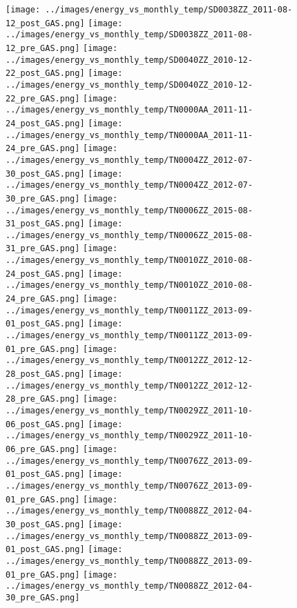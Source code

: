 \clearpage
\begin{figure}
\centering
\texttt{[image: ../images/energy\_vs\_monthly\_temp/SD0038ZZ\_2011-08-12\_post\_GAS.png]}
\texttt{[image: ../images/energy\_vs\_monthly\_temp/SD0038ZZ\_2011-08-12\_pre\_GAS.png]}
\texttt{[image: ../images/energy\_vs\_monthly\_temp/SD0040ZZ\_2010-12-22\_post\_GAS.png]}
\texttt{[image: ../images/energy\_vs\_monthly\_temp/SD0040ZZ\_2010-12-22\_pre\_GAS.png]}
\texttt{[image: ../images/energy\_vs\_monthly\_temp/TN0000AA\_2011-11-24\_post\_GAS.png]}
\texttt{[image: ../images/energy\_vs\_monthly\_temp/TN0000AA\_2011-11-24\_pre\_GAS.png]}
\texttt{[image: ../images/energy\_vs\_monthly\_temp/TN0004ZZ\_2012-07-30\_post\_GAS.png]}
\texttt{[image: ../images/energy\_vs\_monthly\_temp/TN0004ZZ\_2012-07-30\_pre\_GAS.png]}
\texttt{[image: ../images/energy\_vs\_monthly\_temp/TN0006ZZ\_2015-08-31\_post\_GAS.png]}
\texttt{[image: ../images/energy\_vs\_monthly\_temp/TN0006ZZ\_2015-08-31\_pre\_GAS.png]}
\texttt{[image: ../images/energy\_vs\_monthly\_temp/TN0010ZZ\_2010-08-24\_post\_GAS.png]}
\texttt{[image: ../images/energy\_vs\_monthly\_temp/TN0010ZZ\_2010-08-24\_pre\_GAS.png]}
\texttt{[image: ../images/energy\_vs\_monthly\_temp/TN0011ZZ\_2013-09-01\_post\_GAS.png]}
\texttt{[image: ../images/energy\_vs\_monthly\_temp/TN0011ZZ\_2013-09-01\_pre\_GAS.png]}
\texttt{[image: ../images/energy\_vs\_monthly\_temp/TN0012ZZ\_2012-12-28\_post\_GAS.png]}
\texttt{[image: ../images/energy\_vs\_monthly\_temp/TN0012ZZ\_2012-12-28\_pre\_GAS.png]}
\texttt{[image: ../images/energy\_vs\_monthly\_temp/TN0029ZZ\_2011-10-06\_post\_GAS.png]}
\texttt{[image: ../images/energy\_vs\_monthly\_temp/TN0029ZZ\_2011-10-06\_pre\_GAS.png]}
\texttt{[image: ../images/energy\_vs\_monthly\_temp/TN0076ZZ\_2013-09-01\_post\_GAS.png]}
\texttt{[image: ../images/energy\_vs\_monthly\_temp/TN0076ZZ\_2013-09-01\_pre\_GAS.png]}
\texttt{[image: ../images/energy\_vs\_monthly\_temp/TN0088ZZ\_2012-04-30\_post\_GAS.png]}
\texttt{[image: ../images/energy\_vs\_monthly\_temp/TN0088ZZ\_2013-09-01\_post\_GAS.png]}
\texttt{[image: ../images/energy\_vs\_monthly\_temp/TN0088ZZ\_2013-09-01\_pre\_GAS.png]}
\texttt{[image: ../images/energy\_vs\_monthly\_temp/TN0088ZZ\_2012-04-30\_pre\_GAS.png]}
\end{figure}
